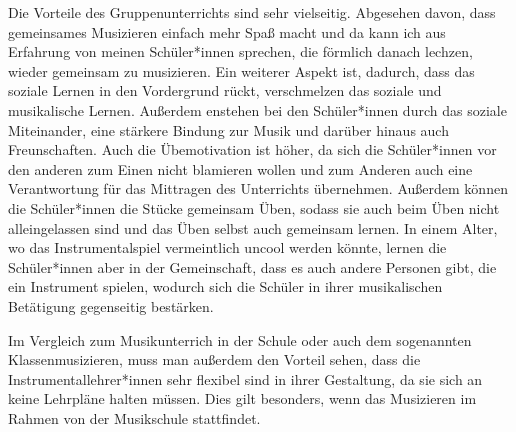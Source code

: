 Die Vorteile des Gruppenunterrichts sind sehr vielseitig. Abgesehen davon, dass
gemeinsames Musizieren einfach mehr Spaß macht und da kann ich aus Erfahrung von
meinen Schüler*innen sprechen, die förmlich danach lechzen, wieder gemeinsam zu
musizieren. Ein weiterer Aspekt ist, dadurch, dass das soziale Lernen in den
Vordergrund rückt, verschmelzen das soziale und musikalische Lernen. Außerdem
enstehen bei den Schüler*innen durch das soziale Miteinander, eine stärkere
Bindung zur Musik und darüber hinaus auch Freunschaften. Auch die Übemotivation
ist höher, da sich die Schüler*innen vor den anderen zum Einen nicht blamieren
wollen und zum Anderen auch eine Verantwortung für das Mittragen des Unterrichts
übernehmen. Außerdem können die Schüler*innen die Stücke gemeinsam Üben, sodass
sie auch beim Üben nicht alleingelassen sind und das Üben selbst auch gemeinsam
lernen. In einem Alter, wo das Instrumentalspiel vermeintlich uncool werden
könnte, lernen die Schüler*innen aber in der Gemeinschaft, dass es auch andere
Personen gibt, die ein Instrument spielen, wodurch sich die Schüler in ihrer
musikalischen Betätigung gegenseitig bestärken.
\autocite{ernst:die_zukunftsfaehige_musikschule}

Im Vergleich zum Musikunterrich in der Schule oder auch dem sogenannten
Klassenmusizieren, muss man außerdem den Vorteil sehen, dass die
Instrumentallehrer*innen sehr flexibel sind in ihrer Gestaltung, da sie sich an
keine Lehrpläne halten müssen. Dies gilt besonders, wenn das Musizieren im
Rahmen von der Musikschule stattfindet.



